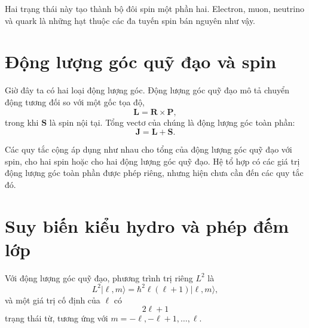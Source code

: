 Hai trạng thái này tạo thành bộ đôi spin một phần hai. Electron, muon, neutrino và quark là những hạt thuộc các đa tuyến spin bán nguyên như vậy.

\section{Động lượng góc quỹ đạo và spin}

Giờ đây ta có hai loại động lượng góc. Động lượng góc quỹ đạo mô tả chuyển động tương đối so với một gốc tọa độ,
\begin{equation}
\mathbf L=\mathbf R\times\mathbf P,
\end{equation}
trong khi \(\mathbf S\) là spin nội tại. Tổng vectơ của chúng là động lượng góc toàn phần:
\begin{equation}
\mathbf J=\mathbf L+\mathbf S.
\end{equation}

\begin{classroomqa}
\end{classroomqa}

Các quy tắc cộng áp dụng như nhau cho tổng của động lượng góc quỹ đạo với spin, cho hai spin hoặc cho hai động lượng góc quỹ đạo. Hệ tổ hợp có các giá trị động lượng góc toàn phần được phép riêng, nhưng hiện chưa cần đến các quy tắc đó.

\begin{classroomqa}
\end{classroomqa}

\section{Suy biến kiểu hydro và phép đếm lớp}

Với động lượng góc quỹ đạo, phương trình trị riêng \(L^{2}\) là
\begin{equation}
L^{2}\lvert\ell,m\rangle
=\hbar^{2}\ell(\ell+1)\lvert\ell,m\rangle,
\end{equation}
và một giá trị cố định của \(\ell\) có
\begin{equation}
2\ell+1
\end{equation}
trạng thái từ, tương ứng với \(m=-\ell,-\ell+1,\ldots,\ell\).


